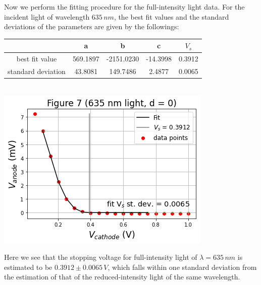 \documentclass[11pt]{book}
\theoremstyle{break}
\theoremstyle{break}
\begin{document}
Now we perform the fitting procedure for the full-intensity light data. For the incident light of wavelength $635\, nm$, the best fit values and the standard deviations of the parameters are given by the followings:
\begin{center}
\begin{tabular}{|c|c|c|c|c|}
\hline
 & a & b & c & $V_s$\\
\hline
best fit value & 569.1897 & -2151.0230 & -14.3998 & 0.3912\\
\hline
standard deviation & 43.8081 & 149.7486 & 2.4877 & 0.0065 \\
\hline
\end{tabular}\\
\hfill\break
\hfill\break
\hfill\break
\includegraphics[scale=0.5]{fig7.png}
\end{center}
Here we see that the stopping voltage for full-intensity light of $\lambda = 635\, nm$ is estimated to be $0.3912\pm 0.0065\, V$, which falls within one standard deviation from the estimation of that of the reduced-intensity light of the same wavelength. \\
\end{document}
